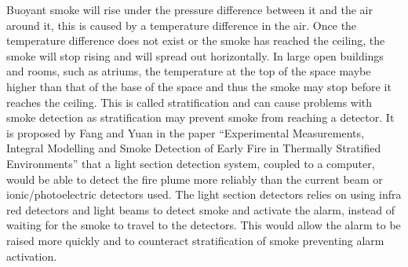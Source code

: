 \documentclass[table,a4paper,oneside]{book}
\begin{document}
Buoyant smoke will rise under the pressure difference between it and the air around it, this is caused by a temperature difference in the air. Once the temperature difference does not exist or the smoke has reached the ceiling, the smoke will stop rising and will spread out horizontally. In large open buildings and rooms, such as atriums, the temperature at the top of the space maybe higher than that of the base of the space and thus the smoke may stop before it reaches the ceiling. This is called stratification and can cause problems with smoke detection as stratification may prevent smoke from reaching a detector. It is proposed by Fang and Yuan in the paper ``Experimental Measurements, Integral Modelling and Smoke Detection of Early Fire in Thermally Stratified Environments'' \citep{Fang200711} that a light section detection system, coupled to a computer, would be able to detect the fire plume more reliably than the current beam or ionic/photoelectric detectors used. The light section detectors relies on using infra red detectors and light beams to detect smoke and activate the alarm, instead of waiting for the smoke to travel to the detectors. This would allow the alarm to be raised more quickly and to counteract stratification of smoke preventing alarm activation.
\end{document}

